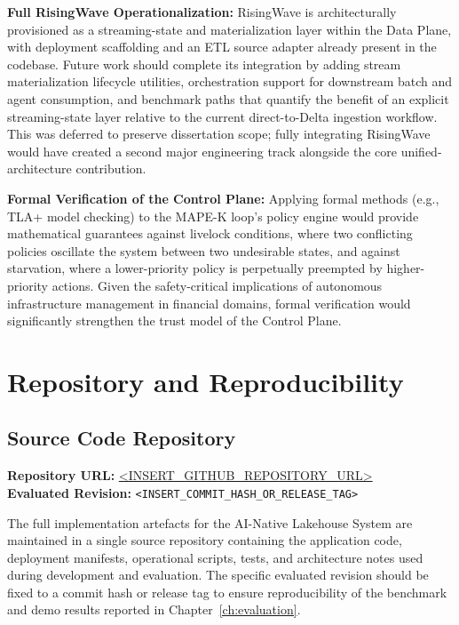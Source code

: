 \documentclass[12pt, a4paper]{report}
\begin{document}
\textbf{Full RisingWave Operationalization:}
RisingWave is architecturally provisioned as a streaming-state and materialization
layer within the Data Plane, with deployment scaffolding and an ETL source adapter
already present in the codebase.
Future work should complete its integration by adding stream materialization lifecycle
utilities, orchestration support for downstream batch and agent consumption, and
benchmark paths that quantify the benefit of an explicit streaming-state layer
relative to the current direct-to-Delta ingestion workflow.
This was deferred to preserve dissertation scope; fully integrating RisingWave would
have created a second major engineering track alongside the core unified-architecture
contribution.

\textbf{Formal Verification of the Control Plane:}
Applying formal methods (e.g., TLA+ model checking) to the MAPE-K loop's policy engine
would provide mathematical guarantees against livelock conditions, where two
conflicting policies oscillate the system between two undesirable states, and against
starvation, where a lower-priority policy is perpetually preempted by higher-priority
actions.
Given the safety-critical implications of autonomous infrastructure management in
financial domains, formal verification would significantly strengthen the trust model
of the Control Plane.



\appendix
\appendixpage

\chapter{Repository and Reproducibility}
\label{app:repo}

\section{Source Code Repository}
\label{app:repo_link}

\noindent\textbf{Repository URL:} \url{<INSERT_GITHUB_REPOSITORY_URL>}\\
\textbf{Evaluated Revision:} \texttt{<INSERT_COMMIT_HASH_OR_RELEASE_TAG>}

\noindent The full implementation artefacts for the AI-Native Lakehouse System are
maintained in a single source repository containing the application code,
deployment manifests, operational scripts, tests, and architecture notes used during
development and evaluation. The specific evaluated revision should be fixed to a
commit hash or release tag to ensure reproducibility of the benchmark and demo
results reported in Chapter~\ref{ch:evaluation}.
\end{document}
